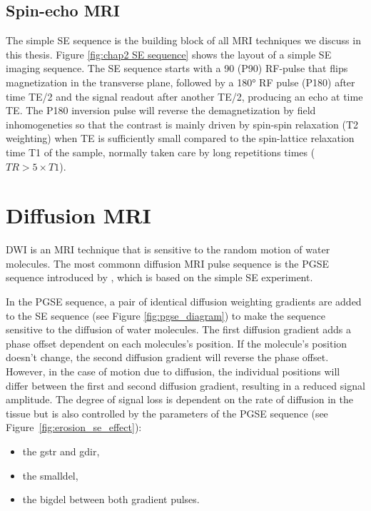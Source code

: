 \subsection*{Spin-echo MRI}
The simple {\gls{SE}} sequence is the building block of all MRI techniques we discuss in this thesis. Figure \ref{fig:chap2 SE sequence} shows the layout of a simple \gls{SE} imaging sequence. The \gls{SE} sequence starts with a 90 (P90) RF-pulse that flips magnetization in the transverse plane, followed by a 180° RF pulse (P180) after time TE/2 and the signal readout after another TE/2, producing an echo at time TE. The P180 inversion pulse will reverse the demagnetization by field inhomogeneties so that the contrast is mainly driven by spin-spin relaxation (T2 weighting) when TE is sufficiently small compared to the spin-lattice relaxation time T1 of the sample, normally taken care by long repetitions times ($TR>5\times T1 $). 

\section{Diffusion MRI}
{\gls{DWI}} is an MRI technique that is sensitive to the random motion of water molecules. The most commonn diffusion MRI pulse sequence is the {\gls{PGSE}} sequence introduced by \cite{Stejskal:1965}, which is based on the simple \gls{SE} experiment. 

In the {\gls{PGSE}} sequence, a pair of identical diffusion weighting gradients are added to the SE sequence (see Figure \ref{fig:pgse_diagram}) to make the sequence sensitive to the diffusion of water molecules. The first diffusion gradient adds a phase offset dependent on each molecules's position. If the molecule's position doesn't change, the second diffusion gradient will reverse the phase offset. However, in the case of motion due to diffusion, the individual positions will differ between the first and second diffusion gradient, resulting in a reduced signal amplitude. The degree of signal loss is dependent on the rate of diffusion in the tissue but is also controlled by the parameters of the {\gls{PGSE}} sequence (see Figure~\ref{fig:erosion_se_effect}):
\begin{itemize}
	\item the {\gls{gstr}} and {\gls{gdir}},
	\item the {\gls{smalldel}},
	\item the {\gls{bigdel}} between both gradient pulses.
\end{itemize}

